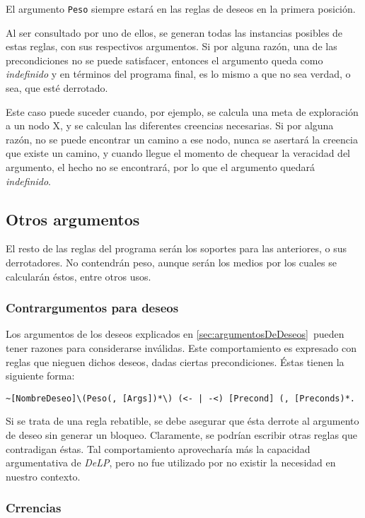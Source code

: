 \documentclass[oneside]{book}
\begin{document}
El argumento \texttt{Peso} siempre estará en las reglas de deseos en la primera posición.

Al ser consultado por uno de ellos, se generan todas las instancias posibles de estas
reglas, con sus respectivos argumentos. Si por alguna razón, una de las precondiciones no
se puede satisfacer, entonces el argumento queda como \textit{indefinido} %
y en términos del programa final, es lo mismo a que no sea verdad, o sea, que esté 
derrotado. 

Este caso puede suceder cuando, por ejemplo, se calcula una meta de 
exploración a un nodo X, y se calculan las diferentes creencias necesarias. Si por 
alguna razón, no se puede encontrar un camino a ese nodo, nunca se asertará la creencia
que existe un camino, y cuando llegue el momento de chequear la veracidad del argumento,
el hecho no se encontrará, por lo que el argumento quedará \textit{indefinido}. 

\subsection{Otros argumentos}

El resto de las reglas del programa serán los soportes para las anteriores, 
o sus derrotadores. No 
contendrán peso, aunque serán los medios por los cuales se calcularán éstos, entre
otros usos.

\subsubsection{Contrargumentos para deseos}

Los argumentos de los deseos explicados en \ref{sec:argumentosDeDeseos}\ pueden tener
razones para considerarse inválidas. Este comportamiento es expresado con reglas que 
nieguen dichos deseos, dadas ciertas precondiciones. Éstas tienen la siguiente forma:

\begin{verbatim}
~[NombreDeseo]\(Peso(, [Args])*\) (<- | -<) [Precond] (, [Preconds)*.
\end{verbatim}

Si se trata de una regla rebatible, se debe asegurar que ésta derrote al argumento
de deseo sin generar un bloqueo. Claramente, se podrían escribir otras reglas que
contradigan éstas. Tal comportamiento aprovecharía más la capacidad argumentativa 
de \textit{DeLP}, pero no fue utilizado por no existir la necesidad
en nuestro contexto.

\subsubsection{Crrencias}
\end{document}
